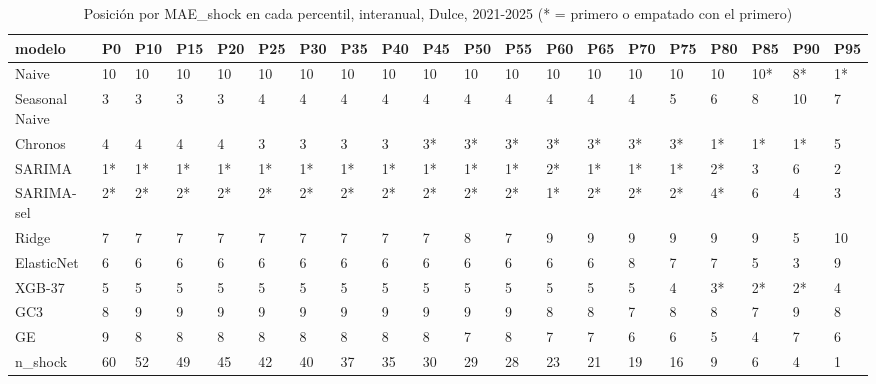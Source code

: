 \begin{table}[H]
\centering
\small
\caption{Posición por MAE\_shock en cada percentil, interanual, Dulce, 2021-2025 (* = primero o empatado con el primero)}
\label{tab:T_barrido_posiciones_interanual_dulce}
\begin{tabular}{llllllllllllllllllll}
\toprule
modelo & P0 & P10 & P15 & P20 & P25 & P30 & P35 & P40 & P45 & P50 & P55 & P60 & P65 & P70 & P75 & P80 & P85 & P90 & P95 \\
\midrule
Naive & 10 & 10 & 10 & 10 & 10 & 10 & 10 & 10 & 10 & 10 & 10 & 10 & 10 & 10 & 10 & 10 & 10* & 8* & 1* \\
Seasonal Naive & 3 & 3 & 3 & 3 & 4 & 4 & 4 & 4 & 4 & 4 & 4 & 4 & 4 & 4 & 5 & 6 & 8 & 10 & 7 \\
Chronos & 4 & 4 & 4 & 4 & 3 & 3 & 3 & 3 & 3* & 3* & 3* & 3* & 3* & 3* & 3* & 1* & 1* & 1* & 5 \\
SARIMA & 1* & 1* & 1* & 1* & 1* & 1* & 1* & 1* & 1* & 1* & 1* & 2* & 1* & 1* & 1* & 2* & 3 & 6 & 2 \\
SARIMA-sel & 2* & 2* & 2* & 2* & 2* & 2* & 2* & 2* & 2* & 2* & 2* & 1* & 2* & 2* & 2* & 4* & 6 & 4 & 3 \\
Ridge & 7 & 7 & 7 & 7 & 7 & 7 & 7 & 7 & 7 & 8 & 7 & 9 & 9 & 9 & 9 & 9 & 9 & 5 & 10 \\
ElasticNet & 6 & 6 & 6 & 6 & 6 & 6 & 6 & 6 & 6 & 6 & 6 & 6 & 6 & 8 & 7 & 7 & 5 & 3 & 9 \\
XGB-37 & 5 & 5 & 5 & 5 & 5 & 5 & 5 & 5 & 5 & 5 & 5 & 5 & 5 & 5 & 4 & 3* & 2* & 2* & 4 \\
GC3 & 8 & 9 & 9 & 9 & 9 & 9 & 9 & 9 & 9 & 9 & 9 & 8 & 8 & 7 & 8 & 8 & 7 & 9 & 8 \\
GE & 9 & 8 & 8 & 8 & 8 & 8 & 8 & 8 & 8 & 7 & 8 & 7 & 7 & 6 & 6 & 5 & 4 & 7 & 6 \\
n\_shock & 60 & 52 & 49 & 45 & 42 & 40 & 37 & 35 & 30 & 29 & 28 & 23 & 21 & 19 & 16 & 9 & 6 & 4 & 1 \\
\bottomrule
\end{tabular}
\end{table}